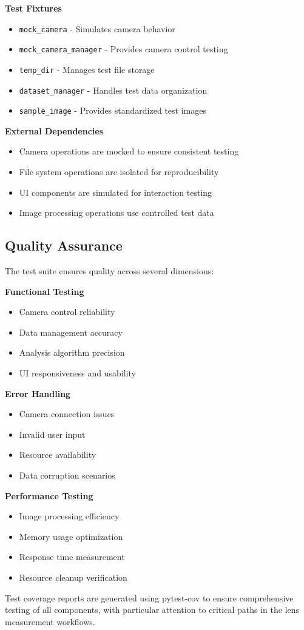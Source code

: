 \textbf{Test Fixtures}
\begin{itemize}
    \item \texttt{mock\_camera} - Simulates camera behavior
    \item \texttt{mock\_camera\_manager} - Provides camera control testing
    \item \texttt{temp\_dir} - Manages test file storage
    \item \texttt{dataset\_manager} - Handles test data organization
    \item \texttt{sample\_image} - Provides standardized test images
\end{itemize}

\textbf{External Dependencies}
\begin{itemize}
    \item Camera operations are mocked to ensure consistent testing
    \item File system operations are isolated for reproducibility
    \item UI components are simulated for interaction testing
    \item Image processing operations use controlled test data
\end{itemize}

\subsection{Quality Assurance}
The test suite ensures quality across several dimensions:

\textbf{Functional Testing}
\begin{itemize}
    \item Camera control reliability
    \item Data management accuracy
    \item Analysis algorithm precision
    \item UI responsiveness and usability
\end{itemize}

\textbf{Error Handling}
\begin{itemize}
    \item Camera connection issues
    \item Invalid user input
    \item Resource availability
    \item Data corruption scenarios
\end{itemize}

\textbf{Performance Testing}
\begin{itemize}
    \item Image processing efficiency
    \item Memory usage optimization
    \item Response time measurement
    \item Resource cleanup verification
\end{itemize}

Test coverage reports are generated using pytest-cov to ensure comprehensive testing of all components, with particular attention to critical paths in the lens measurement workflows.
